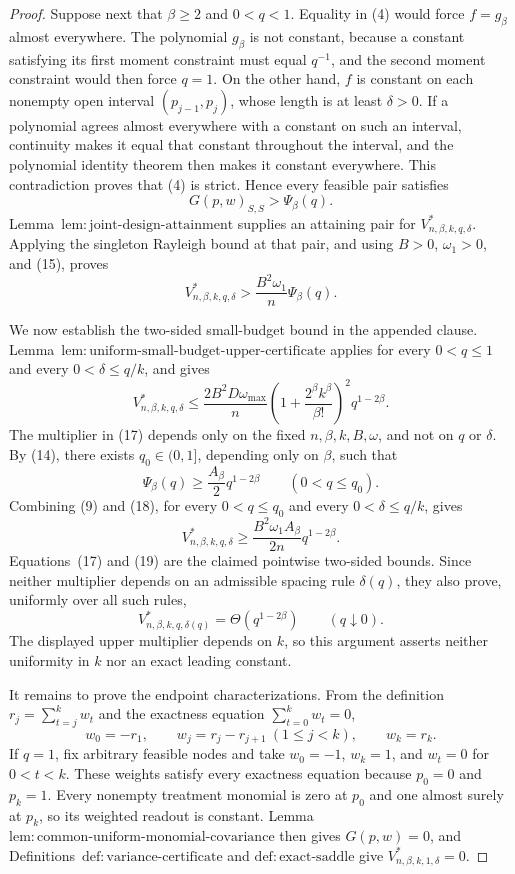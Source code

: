 \documentclass{article}
\begin{document}
\begin{proof}
Suppose next that \(\beta\ge2\) and \(0<q<1\).  Equality in (4) would force \(f=g_\beta\) almost everywhere.  The polynomial \(g_\beta\) is not constant, because a constant satisfying its first moment constraint must equal \(q^{-1}\), and the second moment constraint would then force \(q=1\).  On the other hand, \(f\) is constant on each nonempty open interval \((p_{j-1},p_j)\), whose length is at least \(\delta>0\).  If a polynomial agrees almost everywhere with a constant on such an interval, continuity makes it equal that constant throughout the interval, and the polynomial identity theorem then makes it constant everywhere.  This contradiction proves that (4) is strict.  Hence every feasible pair satisfies
\[
G(p,w)_{S,S}>\Psi_\beta(q).
\tag{15}
\]
Lemma~\(\mathrm{lem{:}joint\text{-}design\text{-}attainment}\) supplies an attaining pair for \(V^*_{n,\beta,k,q,\delta}\).  Applying the singleton Rayleigh bound at that pair, and using \(B>0\), \(\omega_1>0\), and (15), proves
\[
V^*_{n,\beta,k,q,\delta}>
\frac{B^2\omega_1}{n}\Psi_\beta(q).
\tag{16}
\]

We now establish the two-sided small-budget bound in the appended clause.  Lemma~\(\mathrm{lem{:}uniform\text{-}small\text{-}budget\text{-}upper\text{-}certificate}\) applies for every \(0<q\le1\) and every \(0<\delta\le q/k\), and gives
\[
V^*_{n,\beta,k,q,\delta}
\le \frac{2B^2D\omega_{\max}}{n}
\left(1+\frac{2^\beta k^\beta}{\beta!}\right)^2q^{1-2\beta}.
\tag{17}
\]
The multiplier in (17) depends only on the fixed \(n,\beta,k,B,\omega\), and not on \(q\) or \(\delta\).  By (14), there exists \(q_0\in(0,1]\), depending only on \(\beta\), such that
\[
\Psi_\beta(q)\ge \frac{A_\beta}{2}q^{1-2\beta}
\qquad(0<q\le q_0).
\tag{18}
\]
Combining (9) and (18), for every \(0<q\le q_0\) and every \(0<\delta\le q/k\), gives
\[
V^*_{n,\beta,k,q,\delta}
\ge \frac{B^2\omega_1A_\beta}{2n}q^{1-2\beta}.
\tag{19}
\]
Equations~(17) and (19) are the claimed pointwise two-sided bounds.  Since neither multiplier depends on an admissible spacing rule \(\delta(q)\), they also prove, uniformly over all such rules,
\[
V^*_{n,\beta,k,q,\delta(q)}=\Theta(q^{1-2\beta})
\qquad(q\downarrow0).
\tag{20}
\]
The displayed upper multiplier depends on \(k\), so this argument asserts neither uniformity in \(k\) nor an exact leading constant.

It remains to prove the endpoint characterizations.  From the definition \(r_j=\sum_{t=j}^kw_t\) and the exactness equation \(\sum_{t=0}^kw_t=0\),
\[
w_0=-r_1,
\qquad w_j=r_j-r_{j+1}\ (1\le j<k),
\qquad w_k=r_k.
\tag{21}
\]
If \(q=1\), fix arbitrary feasible nodes and take \(w_0=-1\), \(w_k=1\), and \(w_t=0\) for \(0<t<k\).  These weights satisfy every exactness equation because \(p_0=0\) and \(p_k=1\).  Every nonempty treatment monomial is zero at \(p_0\) and one almost surely at \(p_k\), so its weighted readout is constant.  Lemma~\(\mathrm{lem{:}common\text{-}uniform\text{-}monomial\text{-}covariance}\) then gives \(G(p,w)=0\), and Definitions~\(\mathrm{def{:}variance\text{-}certificate}\) and \(\mathrm{def{:}exact\text{-}saddle}\) give \(V^*_{n,\beta,k,1,\delta}=0\).


\end{proof}
\end{document}
